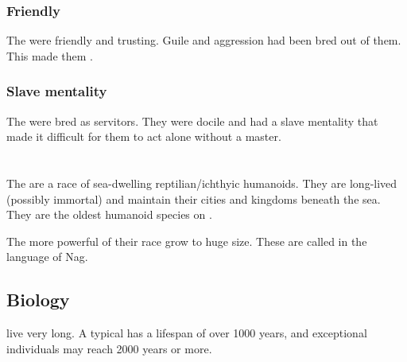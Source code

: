 \subsubsection{Friendly}
The \loculs{} were friendly and trusting. 
Guile and aggression had been bred out of them. 
This made them . 





\subsubsection{Slave mentality}
The \loculs{} were bred as servitors. 
They were docile and had a slave mentality that made it difficult for them to act alone without a master. 















\section{\Nagae}
The \nagae{} are a race of sea-dwelling reptilian/ichthyic humanoids. 
They are long-lived (possibly immortal) and maintain their cities and kingdoms beneath the sea. They are the oldest humanoid species on \Miith{}. 

The more powerful of their race grow to huge size.
These \nagalords{} are called \nagalords{} in the language of Nag.









\subsection{Biology}
\Nagae{} live very long. A typical \naga{} has a lifespan of over 1000 years, and exceptional individuals may reach 2000 years or more. 





